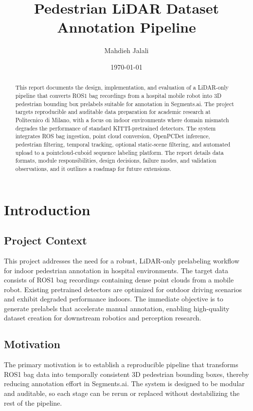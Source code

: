 \documentclass[a4paper,12pt]{report}
\title{Pedestrian LiDAR Dataset Annotation Pipeline}
\author{Mahdieh Jalali}
\date{\today}
\begin{document}
\maketitle

\begin{abstract}
This report documents the design, implementation, and evaluation of a LiDAR-only pipeline that converts ROS1 bag recordings from a hospital mobile robot into 3D pedestrian bounding box prelabels suitable for annotation in Segments.ai. The project targets reproducible and auditable data preparation for academic research at Politecnico di Milano, with a focus on indoor environments where domain mismatch degrades the performance of standard KITTI-pretrained detectors. The system integrates ROS bag ingestion, point cloud conversion, OpenPCDet inference, pedestrian filtering, temporal tracking, optional static-scene filtering, and automated upload to a pointcloud-cuboid sequence labeling platform. The report details data formats, module responsibilities, design decisions, failure modes, and validation observations, and it outlines a roadmap for future extensions.
\end{abstract}

\tableofcontents
\listoffigures
\listoftables

\chapter{Introduction}
\section{Project Context}
This project addresses the need for a robust, LiDAR-only prelabeling workflow for indoor pedestrian annotation in hospital environments. The target data consists of ROS1 bag recordings containing dense point clouds from a mobile robot. Existing pretrained detectors are optimized for outdoor driving scenarios and exhibit degraded performance indoors. The immediate objective is to generate prelabels that accelerate manual annotation, enabling high-quality dataset creation for downstream robotics and perception research.

\section{Motivation}
The primary motivation is to establish a reproducible pipeline that transforms ROS1 bag data into temporally consistent 3D pedestrian bounding boxes, thereby reducing annotation effort in Segments.ai. The system is designed to be modular and auditable, so each stage can be rerun or replaced without destabilizing the rest of the pipeline.
\end{document}
